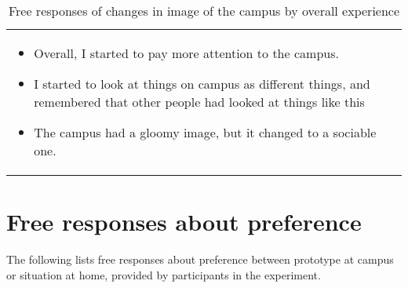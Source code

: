 \begin{table}[h]
    \begin{center}
      \caption{Free responses of changes in image of the campus by overall experience}\label{table:12}
      \begin{tabular}{L{\textwidth}}
        \hline
           \\
        \hline
          {
            \begin{itemize}
              \item Overall, I started to pay more attention to the campus.
              \item I started to look at things on campus as different things, and remembered that other people had looked at things like this
              \item The campus had a gloomy image, but it changed to a sociable one.
            \end{itemize}
          } \\
        \hline
    \end{tabular}
\end{center} 
\end{table}


\chapter{Free responses about preference}

The following lists free responses about preference between prototype at campus or situation at home, provided by participants in the experiment.

